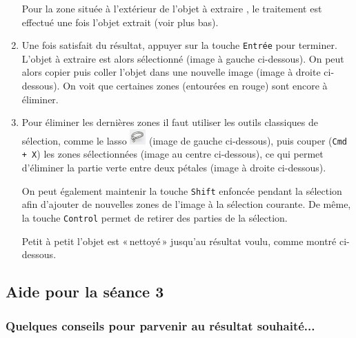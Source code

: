 \begin{enumerate}

Pour la zone située à l'extérieur de l'objet à extraire , le traitement est effectué une fois l'objet extrait (voir plus bas).


\item Une fois satisfait du résultat, appuyer sur la touche \texttt{Entrée} pour terminer. L'objet à extraire est alors sélectionné (image à gauche ci-dessous). On peut alors copier puis coller l'objet dans une nouvelle image (image à droite ci-dessous). On voit que certaines zones (entourées en rouge) sont encore à éliminer.


\item Pour éliminer les dernières zones il faut utiliser les outils classiques de sélection, comme le lasso \includegraphics[width=.7cm]{./images/image03/outilLasso} (image de gauche ci-dessous), puis couper (\texttt{Cmd + X}) les zones sélectionnées (image au centre ci-dessous), ce qui permet d'éliminer la partie verte entre deux pétales (image à droite ci-dessous).

\vspace{6pt}

On peut également maintenir la touche \texttt{Shift} enfoncée pendant la sélection afin d'ajouter de nouvelles zones de l'image à la sélection courante. De même, la touche \texttt{Control} permet de retirer des parties de la sélection.


Petit à petit l'objet est «\,nettoyé\,» jusqu'au résultat voulu, comme montré ci-dessous.


\end{enumerate}

\subsection{Aide pour la séance 3}

\subsubsection{Quelques conseils pour parvenir au résultat souhaité...}


